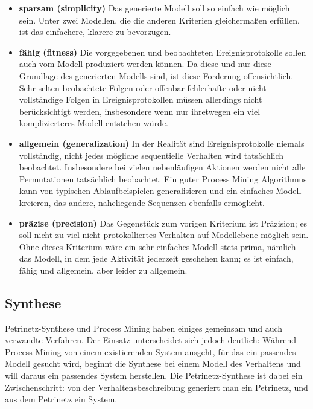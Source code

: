 \begin{itemize}
	\item \textbf{sparsam (simplicity)}
	Das generierte Modell soll so einfach wie möglich sein. Unter zwei Modellen, die die anderen Kriterien gleichermaßen erfüllen, ist das einfachere, klarere zu bevorzugen.

	\item \textbf{fähig (fitness)}
	Die vorgegebenen und beobachteten Ereignisprotokolle sollen auch vom Modell produziert werden können. Da diese und nur diese Grundlage des generierten Modells sind, ist diese Forderung offensichtlich. Sehr selten beobachtete Folgen oder offenbar fehlerhafte oder nicht vollständige Folgen in Ereignisprotokollen müssen allerdings nicht berücksichtigt werden, insbesondere wenn nur ihretwegen ein viel komplizierteres Modell entstehen würde.

	\item \textbf{allgemein (generalization)}
	In der Realität sind Ereignisprotokolle niemals vollständig, nicht jedes mögliche sequentielle Verhalten wird tatsächlich beobachtet. Insbesondere bei vielen nebenläufigen Aktionen werden nicht alle Permutationen tatsächlich beobachtet. Ein guter Process Mining Algorithmus kann von typischen Ablaufbeispielen generalisieren und ein einfaches Modell kreieren, das andere, naheliegende Sequenzen ebenfalls ermöglicht.

	\item \textbf{präzise (precision)}
	Das Gegenstück zum vorigen Kriterium ist Präzision; es soll nicht zu viel nicht protokolliertes Verhalten auf Modellebene möglich sein. Ohne dieses Kriterium wäre ein sehr einfaches Modell stets prima, nämlich das Modell, in dem jede Aktivität jederzeit geschehen kann; es ist einfach, fähig und allgemein, aber leider zu allgemein. 
\end{itemize}

\subsection*{Synthese}
\label{text:synthese}

Petrinetz-Synthese und Process Mining haben einiges gemeinsam und auch verwandte Verfahren. Der Einsatz unterscheidet sich jedoch deutlich: Während Process \mbox{Mining} von einem existierenden System ausgeht, für das ein passendes Modell gesucht wird, beginnt die Synthese bei einem Modell des Verhaltens und will daraus ein passendes System herstellen. Die Petrinetz-Synthese ist dabei ein Zwischenschritt: von der Verhaltensbeschreibung generiert man ein Petrinetz, und aus dem Petrinetz ein System.


